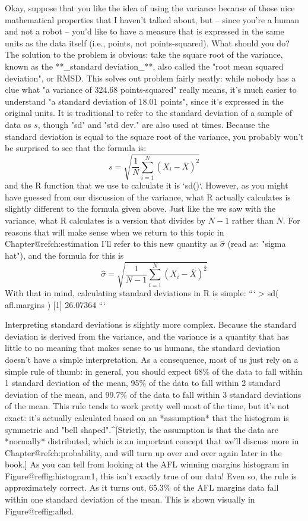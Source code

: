 Okay, suppose that you like the idea of using the variance because of those nice mathematical properties that I haven't talked about, but -- since you're a human and not a robot -- you'd like to have a measure that is expressed in the same units as the data itself (i.e., points, not points-squared). What should you do? The solution to the problem is obvious: take the square root of the variance, known as the **_standard deviation_**, also called the "root mean squared deviation", or RMSD. This solves out problem fairly neatly: while nobody has a clue what "a variance of 324.68 points-squared" really means, it's much easier to understand "a standard deviation of 18.01 points", since it's expressed in the original units. It is traditional to refer to the standard deviation of a sample of data as $s$, though 	"sd" and "std dev." are also used at times. Because the standard deviation is equal to the square root of the variance, you probably won't be surprised to see that the formula is:
$$
s = \sqrt{ \frac{1}{N} \sum_{i=1}^N \left( X_i - \bar{X} \right)^2 }
$$
and the R function that we use to calculate it is `sd()`. However, as you might have guessed from our discussion of the variance, what R actually calculates is slightly different to the formula given above. Just like the we saw with the variance, what R calculates is a version that divides by $N-1$ rather than $N$. For reasons that will make sense when we return to this topic in Chapter@refch:estimation I'll refer to this new quantity as $\hat\sigma$ (read as: "sigma hat"), and the formula for this is
$$
\hat\sigma = \sqrt{ \frac{1}{N-1} \sum_{i=1}^N \left( X_i - \bar{X} \right)^2 }
$$
With that in mind, calculating standard deviations in R is simple:
```
> sd( afl.margins ) 
[1] 26.07364
```

Interpreting standard deviations is slightly more complex. Because the standard deviation is derived from the variance, and the variance is a quantity that has little to no meaning that makes sense to us humans, the standard deviation doesn't have a simple interpretation. As a consequence, most of us just rely on a simple rule of thumb: in general, you should expect 68\% of the data to fall within 1 standard deviation of the mean, 95\% of the data to fall within 2 standard deviation of the mean, and 99.7\% of the data to fall within 3 standard deviations of the mean. This rule tends to work pretty well most of the time, but it's not exact: it's actually calculated based on an *assumption* that the histogram is symmetric and "bell shaped".^[Strictly, the assumption is that the data are *normally* distributed, which is an important concept that we'll discuss more in Chapter@refch:probability, and will turn up over and over again later in the book.] As you can tell from looking at the AFL winning margins histogram in Figure@reffig:histogram1, this isn't exactly true of our data! Even so, the rule is approximately correct. As it turns out, 65.3\% of the AFL margins data fall within one standard deviation of the mean. This is shown visually in Figure@reffig:aflsd.

